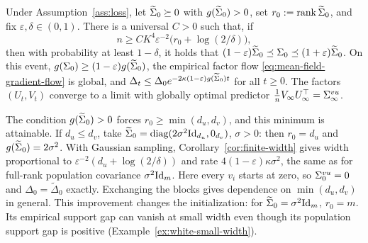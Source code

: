 \begin{corollary}
\label{cor:finite-width}\label{thm:finite-width}
Under Assumption~\ref{ass:loss}, let $\widetilde\Sigma_0\succeq0$ with
$g(\widetilde\Sigma_0)>0$, set $r_0:=\operatorname{rank}\widetilde\Sigma_0$, and fix
$\varepsilon,\delta\in(0,1)$.
There is a universal $C>0$ such that, if
\begin{equation}\label{eq:width}
 n\ge CK^4\varepsilon^{-2}\bigl(r_0+\log(2/\delta)\bigr),
\end{equation}
then with probability at least $1-\delta$, it holds that 
\((1-\varepsilon)\widetilde\Sigma_0\preceq\Sigma_0 \preceq(1+\varepsilon)\widetilde\Sigma_0\).
On this event,
$g(\Sigma_0)\ge(1-\varepsilon)g(\widetilde\Sigma_0)$,
the empirical factor flow \eqref{eq:mean-field-gradient-flow} is global, and
\(\Delta_t\le\Delta_0e^{-2\kappa(1-\varepsilon)g(\widetilde\Sigma_0)t}\)
for all $t\ge0$.
The factors $(U_t, V_t)$ converge to a limit with globally optimal predictor $\frac{1}{n} V_\infty U_\infty^\top = \Sigma^{vu}_\infty$.
\end{corollary}

\begin{remark}\label{rem:rank-adaptive-width}
The condition $g(\widetilde\Sigma_0)>0$ forces $r_0\ge\min(d_u,d_v)$,
and this minimum is attainable. If $d_u\le d_v$, take
$\widetilde\Sigma_0=\operatorname{diag}(2\sigma^2\mathrm{Id}_{d_u},0_{d_v})$, $\sigma>0$:
then $r_0=d_u$ and $g(\widetilde\Sigma_0)=2\sigma^2$.
With Gaussian sampling, Corollary~\ref{cor:finite-width} gives width proportional to
$\varepsilon^{-2}(d_u+\log(2/\delta))$ and rate $4(1-\varepsilon)\kappa\sigma^2$, the same as for full-rank
population covariance $\sigma^2\mathrm{Id}_m$. Here every $v_i$ starts at zero,
so $\Sigma^{vu}_0=0$ and $\Delta_0=\widetilde\Delta_0$ exactly.
Exchanging the blocks gives dependence on $\min(d_u,d_v)$ in general.
This improvement changes the initialization: for $\widetilde\Sigma_0=\sigma^2\mathrm{Id}_m$,
$r_0=m$. Its empirical support gap can vanish at small width even though its
population support gap is positive (Example~\ref{ex:white-small-width}).
\end{remark}

